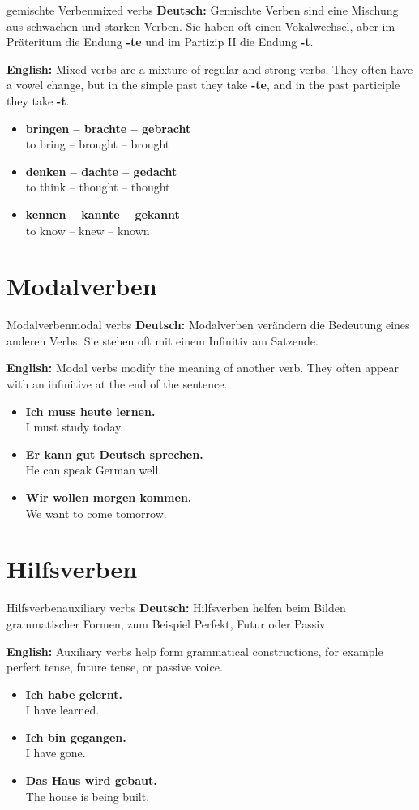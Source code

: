 \documentclass[a4paper,11pt]{article}
\newcommand{\GermanText}[1]{\textbf{Deutsch: }#1\par}
\newcommand{\EnglishText}[1]{{\small\color{SoftGray}\textbf{English: }#1\par}}
\newcommand{\ExampleItem}[2]{\item \textbf{#1}\\{\small\color{SoftGray}#2}}
\begin{document}
\begin{grammarentry}{gemischte Verben}{mixed verbs}
\GermanText{Gemischte Verben sind eine Mischung aus schwachen und starken Verben. Sie haben oft einen Vokalwechsel, aber im Präteritum die Endung \textbf{-te} und im Partizip II die Endung \textbf{-t}.}
\EnglishText{Mixed verbs are a mixture of regular and strong verbs. They often have a vowel change, but in the simple past they take \textbf{-te}, and in the past participle they take \textbf{-t}.}

\begin{exbox}
\begin{itemize}
\ExampleItem{bringen -- brachte -- gebracht}{to bring -- brought -- brought}
\ExampleItem{denken -- dachte -- gedacht}{to think -- thought -- thought}
\ExampleItem{kennen -- kannte -- gekannt}{to know -- knew -- known}
\end{itemize}
\end{exbox}
\end{grammarentry}

\section{Modalverben}

\begin{grammarentry}{Modalverben}{modal verbs}
\GermanText{Modalverben verändern die Bedeutung eines anderen Verbs. Sie stehen oft mit einem Infinitiv am Satzende.}
\EnglishText{Modal verbs modify the meaning of another verb. They often appear with an infinitive at the end of the sentence.}

\begin{exbox}
\begin{itemize}
\ExampleItem{Ich muss heute lernen.}{I must study today.}
\ExampleItem{Er kann gut Deutsch sprechen.}{He can speak German well.}
\ExampleItem{Wir wollen morgen kommen.}{We want to come tomorrow.}
\end{itemize}
\end{exbox}
\end{grammarentry}

\section{Hilfsverben}

\begin{grammarentry}{Hilfsverben}{auxiliary verbs}
\GermanText{Hilfsverben helfen beim Bilden grammatischer Formen, zum Beispiel Perfekt, Futur oder Passiv.}
\EnglishText{Auxiliary verbs help form grammatical constructions, for example perfect tense, future tense, or passive voice.}

\begin{exbox}
\begin{itemize}
\ExampleItem{Ich habe gelernt.}{I have learned.}
\ExampleItem{Ich bin gegangen.}{I have gone.}
\ExampleItem{Das Haus wird gebaut.}{The house is being built.}
\end{itemize}
\end{exbox}
\end{grammarentry}
\end{document}
